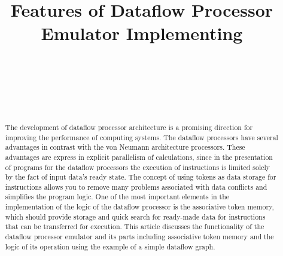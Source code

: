 \documentclass[
11pt,%
tightenlines,%
twoside,%
onecolumn,%
nofloats,%
nobibnotes,%
nofootinbib,%
superscriptaddress,%
noshowpacs,%
centertags]%
{revtex4}
\begin{document}

\title{Features of Dataflow Processor Emulator Implementing}

\author{~}

\author{~}

\author{~}



\begin{abstract}
The development of dataflow processor architecture is a promising direction for improving the performance of computing systems.
The dataflow processors have several advantages in contrast with the von Neumann architecture processors.
These advantages are express in explicit parallelism of calculations, since in the presentation of programs for the dataflow processors the execution of instructions is limited solely by the fact of input data’s ready state.
The concept of using tokens as data storage for instructions allows you to remove many problems associated with data conflicts and simplifies the program logic.
One of the most important elements in the implementation of the logic of the dataflow processor is the associative token memory, which should provide storage and quick search for ready-made data for instructions that can be transferred for execution.
This article discusses the functionality of the dataflow processor emulator and its parts including associative token memory and the logic of its operation using the example of a simple dataflow graph.
\end{abstract}
\end{document}
